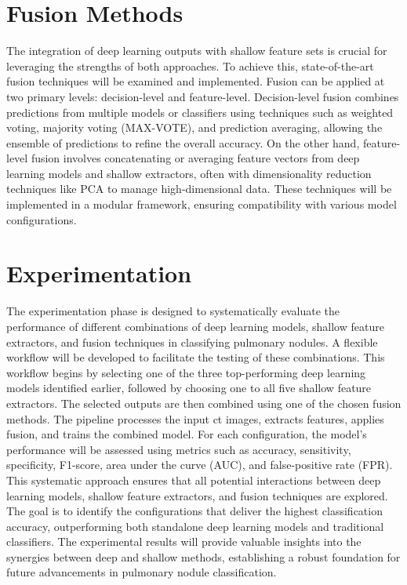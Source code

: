 \section{Fusion Methods}
The integration of deep learning outputs with shallow feature sets is crucial for leveraging the strengths of both approaches. To achieve this, state-of-the-art fusion techniques will be examined and implemented. Fusion can be applied at two primary levels: decision-level and feature-level. Decision-level fusion combines predictions from multiple models or classifiers using techniques such as weighted voting, majority voting (MAX-VOTE), and prediction averaging, allowing the ensemble of predictions to refine the overall accuracy. On the other hand, feature-level fusion involves concatenating or averaging feature vectors from deep learning models and shallow extractors, often with dimensionality reduction techniques like \ac{PCA} to manage high-dimensional data. These techniques will be implemented in a modular framework, ensuring compatibility with various model configurations.

\section{Experimentation}
The experimentation phase is designed to systematically evaluate the performance of different combinations of deep learning models, shallow feature extractors, and fusion techniques in classifying pulmonary nodules. A flexible workflow will be developed to facilitate the testing of these combinations. This workflow begins by selecting one of the three top-performing deep learning models identified earlier, followed by choosing one to all five shallow feature extractors. The selected outputs are then combined using one of the chosen fusion methods. The pipeline processes the input \ac{ct} images, extracts features, applies fusion, and trains the combined model. For each configuration, the model's performance will be assessed using metrics such as accuracy, sensitivity, specificity, F1-score, area under the curve (AUC), and false-positive rate (FPR).
This systematic approach ensures that all potential interactions between deep learning models, shallow feature extractors, and fusion techniques are explored. The goal is to identify the configurations that deliver the highest classification accuracy, outperforming both standalone deep learning models and traditional classifiers. The experimental results will provide valuable insights into the synergies between deep and shallow methods, establishing a robust foundation for future advancements in pulmonary nodule classification.


